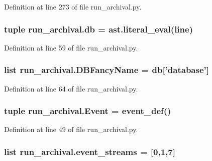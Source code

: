 Definition at line 273 of file run\-\_\-archival.\-py.

\hypertarget{namespacerun__archival_a76dda95c4c4434f57e40766fc2aff53c}{
\subsubsection[{db}]{\setlength{\rightskip}{0pt plus 5cm}tuple run\-\_\-archival.\-db = ast.\-literal\-\_\-eval({\bf line})}}\label{namespacerun__archival_a76dda95c4c4434f57e40766fc2aff53c}


Definition at line 59 of file run\-\_\-archival.\-py.

\hypertarget{namespacerun__archival_a4b6a8f18621f35aec3e99d318bca2898}{
\subsubsection[{D\-B\-Fancy\-Name}]{\setlength{\rightskip}{0pt plus 5cm}list run\-\_\-archival.\-D\-B\-Fancy\-Name = {\bf db}\mbox{[}'database'\mbox{]}}}\label{namespacerun__archival_a4b6a8f18621f35aec3e99d318bca2898}


Definition at line 64 of file run\-\_\-archival.\-py.

\hypertarget{namespacerun__archival_a81b9709cc3c8589bfc7ecd72c354cba6}{
\subsubsection[{Event}]{\setlength{\rightskip}{0pt plus 5cm}tuple run\-\_\-archival.\-Event = event\-\_\-def()}}\label{namespacerun__archival_a81b9709cc3c8589bfc7ecd72c354cba6}


Definition at line 49 of file run\-\_\-archival.\-py.

\hypertarget{namespacerun__archival_a175f39c7d10885511c4623d3425db6ba}{
\subsubsection[{event\-\_\-streams}]{\setlength{\rightskip}{0pt plus 5cm}list run\-\_\-archival.\-event\-\_\-streams = \mbox{[}0,1,7\mbox{]}}}\label{namespacerun__archival_a175f39c7d10885511c4623d3425db6ba}


